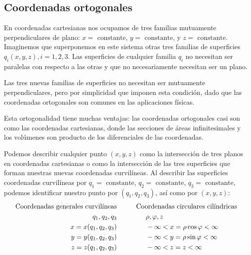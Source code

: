 \subsection{Coordenadas ortogonales}
En coordenadas cartesianas nos ocupamos de tres familias mutuamente perpendiculares de plano: $x = \mbox{ constante}$, $y = \mbox{ constante}$, y $z = \mbox{ constante}$. Imaginemos que superponemos en este sistema otras tres familias de superficies $q_{i} (x, y, z), i = 1, 2, 3$. Las superficies de cualquier familia $q_{i}$ no necesitan ser paralelas con respecto a las otras  y que no necesariamente necesitan ser un plano.
\par
Las tres nuevas familias de superficies no necesitan ser mutuamente perpendiculares, pero por simplicidad que imponen esta condición, dado que las coordenadas ortogonales son comunes en las aplicaciones físicas.
\par
Esta ortogonalidad tiene muchas ventajas: las coordenadas ortogonales casi son como las coordenadas cartesianas, donde las secciones de áreas infinitesimales y los volúmenes son producto de los diferenciales de las coordenadas.
\par
Podemos describir cualquier punto $(x, y, z)$ como la intersección de tres planos en coordenadas cartesianas o como la intersección de las tres superficies que forman nuestras nuevas coordenadas curvilíneas. Al describir las superficies coordenadas curvilíneas por $q_{1} = \mbox{ constante}$, $q_{2} = \mbox{ constante}$, $q_{3} = \mbox{ constante}$, podemos identificar nuestro punto por $(q_{1}, q_{2}, q_{3})$, así como por $(x, y, z)$:
\begin{eqnarray}
\begin{aligned}
\mbox{Coordenadas  generales curvilíneas} & \hspace{1.cm} \mbox{Coordenadas circulares cilíndricas} \\
q_{1}, q_{2}, q_{3} & \hspace{1.5cm} \rho, \varphi, z \\ 
x = x(q_{1},q_{2}, q_{3}) & \hspace{1.5cm} - \infty < x = \rho \cos \varphi < \infty \\ 
y = y(q_{1},q_{2}, q_{3}) & \hspace{1.5cm} - \infty < y = \rho \sin \varphi < \infty \\
z = z(q_{1},q_{2}, q_{3}) & \hspace{1.5cm} - \infty < z = z < \infty
\label{eq:ecuacion_02_01}
\end{aligned}
\end{eqnarray}
